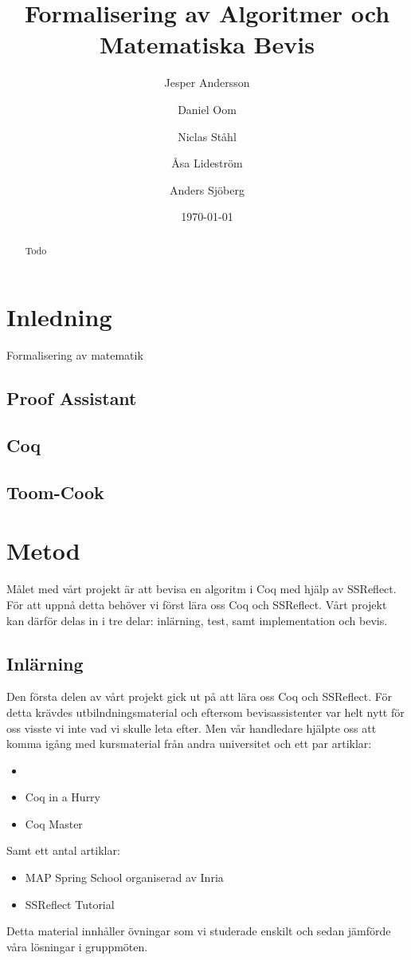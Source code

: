 \documentclass[a4paper]{article}
\title{Formalisering av Algoritmer och Matematiska Bevis}
\author[1]{Jesper Andersson}
\author[1]{Daniel Oom}
\author[1]{Niclas Ståhl}
\author[2]{Åsa Lideström}
\author[2]{Anders Sjöberg}
\affil[1]{Datateknik, Chalmers}
\affil[2]{Mattematik, Göteborgs Universitet}
\date{\today}
\begin{document}
\begin{abstract}
Todo
\end{abstract}

\maketitle
\thispagestyle{empty}
\newpage
\tableofcontents
\newpage

\section{Inledning}
Formalisering av matematik

\subsection{Proof Assistant}
\subsection{Coq}
\subsection{Toom-Cook}

\section{Metod}

Målet med vårt projekt är att bevisa en algoritm i Coq med hjälp av SSReflect.
För att uppnå detta behöver vi först lära oss Coq och SSReflect. Vårt projekt
kan därför delas in i tre delar: inlärning, test, samt implementation och
bevis.

\subsection{Inlärning}
Den första delen av vårt projekt gick ut på att lära oss Coq och SSReflect. För
detta krävdes utbilndningsmaterial och eftersom bevisassistenter var helt nytt
för oss visste vi inte vad vi skulle leta efter. Men vår handledare hjälpte oss
att komma igång med kursmaterial från andra universitet och ett par artiklar:
\begin{itemize}
  \item \cite{pierce2010software}
  \item Coq in a Hurry
  \item Coq Master
\end{itemize}
Samt ett antal artiklar:
\begin{itemize}
  \item MAP Spring School organiserad av Inria
  \item SSReflect Tutorial
\end{itemize}
Detta material innhåller övningar som vi studerade enskilt och sedan jämförde
våra lösningar i gruppmöten.
\end{document}
